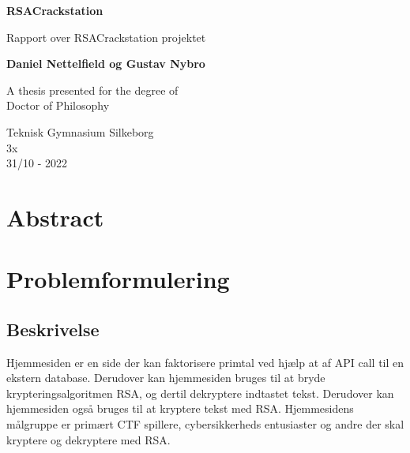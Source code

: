 \documentclass{article}
\begin{document}
    \begin{titlepage}
        \begin{center}
            \vspace{1cm}

            \textbf{RSACrackstation}

            \vspace{0.5cm}
            Rapport over RSACrackstation projektet

            \vspace{1.5cm}

            \textbf{Daniel Nettelfield og Gustav Nybro}

            \vfill

            A thesis presented for the degree of\\
            Doctor of Philosophy

            \vspace{0.8cm}



            Teknisk Gymnasium Silkeborg\\
            3x\\
            31/10 - 2022

        \end{center}
    \end{titlepage}

    \newpage



    \tableofcontents


    \section{Abstract}\label{sec:abstract}


    \section{Problemformulering}\label{sec:problemformulering}

    \subsection{Beskrivelse}\label{subsec:beskrivelse}
    Hjemmesiden er en side der kan faktorisere primtal ved hjælp at af API call til en ekstern database.
    Derudover kan hjemmesiden bruges til at bryde krypteringsalgoritmen RSA, og dertil dekryptere indtastet tekst.
    Derudover kan hjemmesiden også bruges til at kryptere tekst med RSA. Hjemmesidens målgruppe er primært CTF
    spillere, cybersikkerheds entusiaster og andre der skal kryptere og dekryptere med RSA\@.
\end{document}
